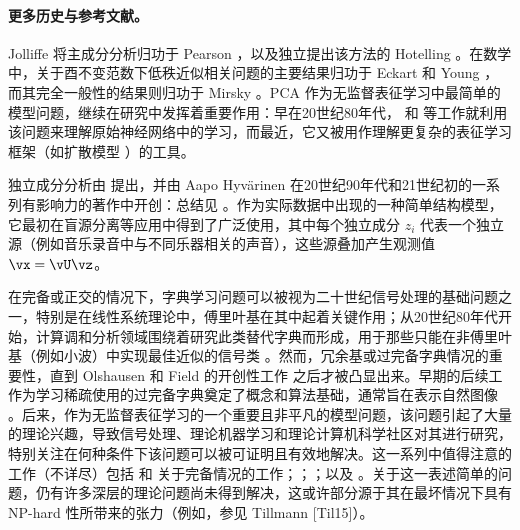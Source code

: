 \documentclass[../../book-main_zh.tex]{subfiles}
\begin{document}
\paragraph{更多历史与参考文献。}
Jolliffe \cite{Jolliffe1986} 将主成分分析归功于 Pearson
\cite{Pearson1901}，以及独立提出该方法的 Hotelling
\cite{Hotelling1933}。在数学中，关于酉不变范数下低秩近似相关问题的主要结果归功于 Eckart 和 Young
\cite{Eckart1936-ep}，而其完全一般性的结果则归功于 Mirsky \cite{Mirsky1960-ek}。PCA
作为无监督表征学习中最简单的模型问题，继续在研究中发挥着重要作用：早在20世纪80年代，\textcite{Oja1982SimplifiedNM}
和 \textcite{Baldi89}
等工作就利用该问题来理解原始神经网络中的学习，而最近，它又被用作理解更复杂的表征学习框架（如扩散模型 \cite{wang2024diffusion}）的工具。

独立成分分析由 \textcite{Ans-1985} 提出，并由 Aapo Hyv\"{a}rinen
在20世纪90年代和21世纪初的一系列有影响力的著作中开创：总结见
\textcite{Hyvrinen-2000}。作为实际数据中出现的一种简单结构模型，它最初在盲源分离等应用中得到了广泛使用，其中每个独立成分
$z_i$ 代表一个独立源（例如音乐录音中与不同乐器相关的声音），这些源叠加产生观测值 $\vx = \vU \vz$。

在完备或正交的情况下，字典学习问题可以被视为二十世纪信号处理的基础问题之一，特别是在线性系统理论中，傅里叶基在其中起着关键作用；从20世纪80年代开始，计算调和分析领域围绕着研究此类替代字典而形成，用于那些只能在非傅里叶基（例如小波）中实现最佳近似的信号类
\cite{Donoho1998-zf}。然而，冗余基或过完备字典情况的重要性，直到 Olshausen 和 Field 的开创性工作
\cite{Olshausen1996-ap,Olshausen1997-yv}
之后才被凸显出来。早期的后续工作为学习稀疏使用的过完备字典奠定了概念和算法基础，通常旨在表示自然图像
\cite{Donoho2001-tl,DonohoD2003-PNAS,Elad2006-yi,Murray2007-cw,aharon2006k,Mairal2014-nq,Gribonval2015-fy}。后来，作为无监督表征学习的一个重要且非平凡的模型问题，该问题引起了大量的理论兴趣，导致信号处理、理论机器学习和理论计算机科学社区对其进行研究，特别关注在何种条件下该问题可以被可证明且有效地解决。这一系列中值得注意的工作（不详尽）包括
\textcite{Spielman2012-tl} 和 \textcite{sun2017complete_a}
关于完备情况的工作；\textcite{pmlr-v40-Arora15}；\textcite{Barak2015-uu}；以及
\textcite{Qu2020Geometric}。关于这一表述简单的问题，仍有许多深层的理论问题尚未得到解决，这或许部分源于其在最坏情况下具有 NP-hard 性所带来的张力（例如，参见 Tillmann [Til15]）。
\end{document}
